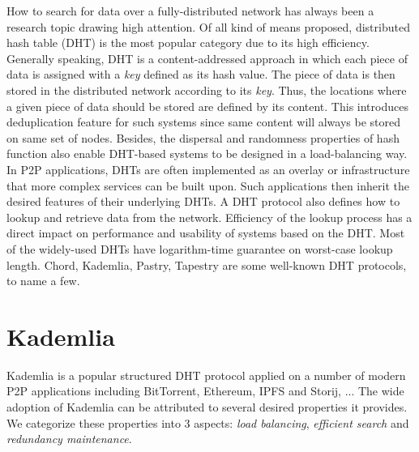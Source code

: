How to search for data over a fully-distributed network has always been a research topic drawing high attention. Of all kind of means proposed, distributed hash table (DHT) is the most popular category due to its high efficiency. Generally speaking, DHT is a content-addressed approach in which each piece of data is assigned with a \textit{key} defined as its hash value. The piece of data is then stored in the distributed network according to its \textit{key}. Thus, the locations where a given piece of data should be stored are defined by its content. This introduces deduplication feature for such systems since same content will always be stored on same set of nodes. Besides, the dispersal and randomness properties of hash function also enable DHT-based systems to be designed in a load-balancing way. In P2P applications, DHTs are often implemented as an overlay or infrastructure that more complex services can be built upon. Such applications then inherit the desired features of their underlying DHTs. A DHT protocol also defines how to lookup and retrieve data from the network. Efficiency of the lookup process has a direct impact on performance and usability of systems based on the DHT. Most of the widely-used DHTs have logarithm-time guarantee on worst-case lookup length. Chord\cite{stoica2001chord}, Kademlia\cite{maymounkov2002kademlia}, Pastry\cite{rowstron2001pastry}, Tapestry\cite{zhao2004tapestry} are some well-known DHT protocols, to name a few.

\newpage

\section{Kademlia}
\label{s:kademlia}
Kademlia\cite{maymounkov2002kademlia} is a popular structured DHT protocol applied on a number of modern P2P applications including BitTorrent\cite{bittorrent}, Ethereum\cite{ethereum}, IPFS\cite{ipfs} and Storij\cite{storij}, ... The wide adoption of Kademlia can be attributed to several desired properties it provides. We categorize these properties into 3 aspects: \textit{load balancing}, \textit{efficient search} and \textit{redundancy maintenance}.

